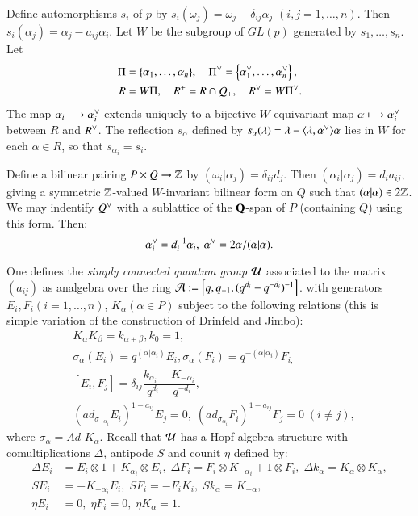 Define automorphisms $s_{i}$ of $p$ by $s_{i}(\omega_{j}) = \omega_{j}-\delta_{ij}\alpha_{j}$ $(i,j = 1, \ldots, n)$.
Then $s_{i}(\alpha_{j}) = \alpha_{j}-a_{ij}\alpha_{i}$. Let $W$ be the subgroup of $GL(p)$ generated by $s_{1}, \ldots, s_{n}$. Let
\begin{align*}
\Pi &= \{\alpha_{1}, \ldots, \alpha_{n}\}, \quad \Pi\spcheck = \left\{\alpha_{1}\spcheck, \ldots, \alpha_{n}\spcheck\right\},\\
 R &= W\Pi,\quad R^{+} = R\cap Q_{+},\quad R\spcheck = W\Pi\spcheck . 
\end{align*}
The map $\alpha_{i}\longmapsto \alpha_{i}\spcheck$ extends uniquely to a bijective $W$-equivariant map $\alpha \longmapsto \alpha_{i}\spcheck$ between $R$ and $R\spcheck$. The reflection $s_{\alpha}$ defined by $s_{\alpha}(\lambda) = \lambda-\langle \lambda, \alpha\spcheck\rangle\alpha$ lies in $W$ for each $\alpha \in R$, so that $s_{\alpha_{i}}=s_{i}$.

Define a bilinear pairing $P\times Q \rightarrow \mathbb{Z}$ by $(\omega_{i}|\alpha_{j})=\delta_{ij}d_{j}$. Then $(\alpha_{i}|\alpha_{j}) = d_{i}a_{ij}$, giving a symmetric $\mathbb{Z}$-valued $W$-invariant bilinear form on $Q$ such that $(\alpha |\alpha) \in 2\mathbb{Z}$. We may indentify $Q\spcheck$ with a sublattice of the $\mathbf{Q}$-span of $P$ (containing $Q$) using this form. Then: 
$$
\alpha_{i}\spcheck = d_{i}^{-1}\alpha_{i}, \; \alpha\spcheck= 2\alpha/(\alpha|\alpha).
$$

One defines the \textit{simply connected quantum group} $\mathcal{U}$ associated to the matrix $(a_{ij})$ as analgebra over the ring $\mathcal{A}:= \left[q, q_{-1}, (q^{d_{i}}-q^{-d_{i}})^{-1}\right]$. with generators $E_{i}, F_{i}(i = 1, \ldots, n)$, $K_{\alpha}(\alpha \in P)$ subject to the following relations (this is simple variation of the construction of Drinfeld and Jimbo): 
\begin{align*}
 &K_{\alpha}K_{\beta} = k_{\alpha+\beta}, k_{0}=1,\\
&\sigma_{\alpha}(E_{i}) = q^{(\alpha | \alpha_{i})}E_{i}, \sigma_{\alpha}(F_{i}) = q^{-(\alpha | \alpha_{i})}F_{i,}\\
&[E_{i}, F_{j}] = \delta_{ij}\dfrac{k_{\alpha_{i}}-K_{-\alpha_{i}}}{q^{d_{i}}-q^{-d_{i}}},\\
&(ad_{\sigma_{-\alpha_{i}}}E_{i})^{1-a_{ij}}E_{j} = 0, \; (ad_{\sigma_{\alpha_{i}}}F_{i})^{1-a_{ij}}F_{j} = 0\; (i \neq j),
\end{align*}
where $\sigma_{\alpha} = Ad$ $K_{\alpha}$. Recall that $\mathcal{U}$ has a Hopf algebra structure with comultiplications $\Delta$, antipode $S$ and counit $\eta$ defined by: 
\begin{align*}
\Delta E_{i} &= E_{i}\otimes 1 + K_{\alpha_{i}} \otimes E_{i}, \; \Delta F_{i} = F_{i}\otimes K_{-\alpha_{i}} + 1 \otimes F_{i},\; \Delta k_{\alpha} = K_{\alpha}\otimes K_{\alpha},\\
SE_{i}& = -K_{-\alpha_{i}}E_{i}, \; SF_{i} =-F_{i}K_{i}, \; Sk_{\alpha} = K_{-\alpha},\\
\eta E_{i} &= 0, \; \eta F_{i} = 0,\; \eta K_{\alpha} = 1. 
\end{align*}

